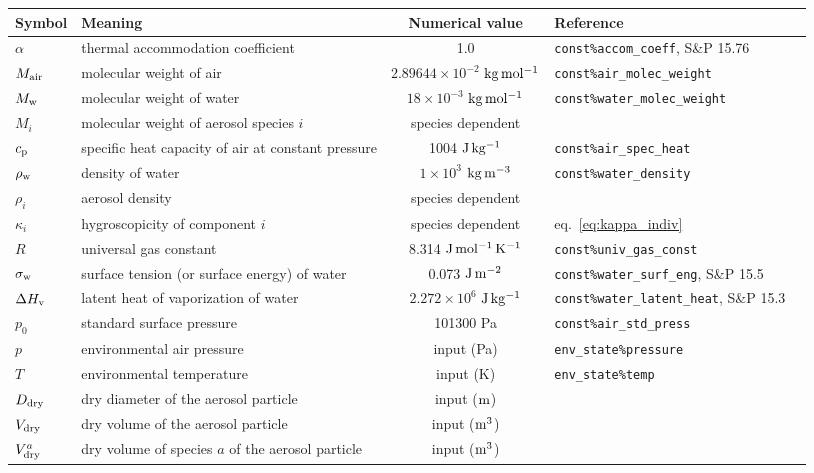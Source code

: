 \documentclass{article}
\begin{document}
\vspace{2cm}
\begin{tabular}{lp{4cm}clp{3cm}}
\hline Symbol & Meaning  & Numerical value &  Reference    \\
\hline             
$\alpha$   &  thermal accommodation coefficient    & 1.0 & \verb+const%accom_coeff+, S\&P 15.76 \\
$M_{\rm air} $      &  molecular weight of air      & $2.89644 \times 10^{-2} $  $\rm{kg \,mol^{-1}}$ &  \verb+const%air_molec_weight+   \\
$M_{\rm w} $    &  molecular weight of water        & $18\times10^{-3}$ $\rm{kg \, mol^{-1}}  $  &  \verb+const%water_molec_weight+    \\
$M_i $      &  molecular weight of aerosol species $i$  & species dependent &    \\
$c_{\rm p}$       &  specific heat capacity of air at constant pressure  & 1004 $\rm{J \, kg^{-1}}$ & \verb+const%air_spec_heat+     \\
$\rho_{\rm w}$ &  density of water & $1\times10^{3}$ $\rm{kg \, m^{-3}}  $ &   \verb+const%water_density+ \\ 
$ \rho_i$    &  aerosol density   & species dependent  &     \\
$\kappa_i$      &  hygroscopicity of component $i$   & species dependent  &  eq.~\ref{eq:kappa_indiv}   \\
$R$     &  universal gas constant  & 8.314 $\rm{J \, mol^{-1}\, K^{-1}}$   &  \verb+const%univ_gas_const+ \\
$\sigma_{\rm w}$     &  surface tension (or surface energy) of water  & 0.073 $\rm{J \, m^{-2}}$ & \verb+const%water_surf_eng+, S\&P 15.5  \\
$\Delta H_{\rm  v}$  & latent heat of vaporization of water   & $2.272\times10^{6}$ $\rm{J \, kg^{-1}}$ & \verb+const%water_latent_heat+, S\&P 15.3 \\ 
$p_0$ & standard surface pressure &  101300 Pa & \verb+const%air_std_press+ \\
$p$     &  environmental air pressure & input  (Pa) &  \verb+env_state%pressure+ \\
$T$     &  environmental temperature  & input  (K) &  \verb+env_state%temp+  \\
$D_{\rm dry}$       & dry diameter of the aerosol particle   & input ($\rm m$) &    \\
$V_{\rm dry}$       & dry volume of the aerosol particle   & input ($\rm m^3$) &    \\
$V^a_{\rm dry}$       & dry volume of species $a$ of the aerosol particle   & input ($\rm m^3$) &    \\

\end{tabular}
\end{document}
